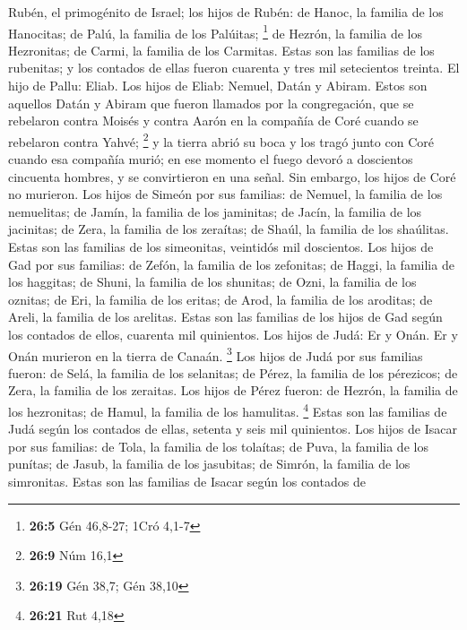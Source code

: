  Rubén, el primogénito de Israel; los hijos de Rubén: de
Hanoc, la familia de los Hanocitas; de Palú, la familia de los Palúitas;
\footnote{\textbf{26:5} Gén 46,8-27; 1Cró 4,1-7}  de
Hezrón, la familia de los Hezronitas; de Carmi, la familia de los
Carmitas.  Estas son las familias de los rubenitas; y los
contados de ellas fueron cuarenta y tres mil setecientos treinta.
 El hijo de Pallu: Eliab.  Los hijos de
Eliab: Nemuel, Datán y Abiram. Estos son aquellos Datán y Abiram que
fueron llamados por la congregación, que se rebelaron contra Moisés y
contra Aarón en la compañía de Coré cuando se rebelaron contra Yahvé;
\footnote{\textbf{26:9} Núm 16,1}  y la tierra abrió su
boca y los tragó junto con Coré cuando esa compañía murió; en ese
momento el fuego devoró a doscientos cincuenta hombres, y se
convirtieron en una señal.  Sin embargo, los hijos de
Coré no murieron.  Los hijos de Simeón por sus familias:
de Nemuel, la familia de los nemuelitas; de Jamín, la familia de los
jaminitas; de Jacín, la familia de los jacinitas;  de
Zera, la familia de los zeraítas; de Shaúl, la familia de los shaúlitas.
 Estas son las familias de los simeonitas, veintidós mil
doscientos.  Los hijos de Gad por sus familias: de Zefón,
la familia de los zefonitas; de Haggi, la familia de los haggitas; de
Shuni, la familia de los shunitas;  de Ozni, la familia
de los oznitas; de Eri, la familia de los eritas;  de
Arod, la familia de los aroditas; de Areli, la familia de los arelitas.
 Estas son las familias de los hijos de Gad según los
contados de ellos, cuarenta mil quinientos.  Los hijos de
Judá: Er y Onán. Er y Onán murieron en la tierra de Canaán. \footnote{\textbf{26:19}
  Gén 38,7; Gén 38,10}  Los hijos de Judá por sus
familias fueron: de Selá, la familia de los selanitas; de Pérez, la
familia de los pérezicos; de Zera, la familia de los zeraitas.
 Los hijos de Pérez fueron: de Hezrón, la familia de los
hezronitas; de Hamul, la familia de los hamulitas. \footnote{\textbf{26:21}
  Rut 4,18}  Estas son las familias de Judá según los
contados de ellas, setenta y seis mil quinientos.  Los
hijos de Isacar por sus familias: de Tola, la familia de los tolaítas;
de Puva, la familia de los punítas;  de Jasub, la familia
de los jasubitas; de Simrón, la familia de los simronitas.
 Estas son las familias de Isacar según los contados de
